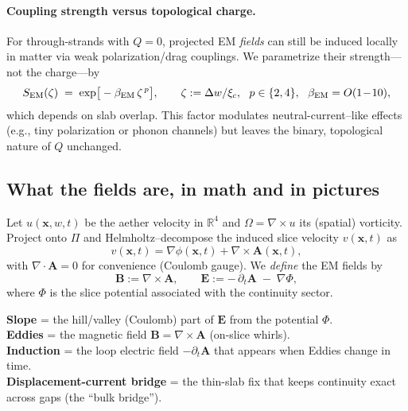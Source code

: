 \paragraph{Coupling strength versus topological charge.}
For through-strands with $Q=0$, projected EM \emph{fields} can still be induced locally in matter via weak polarization/drag couplings. We parametrize their strength—not the charge—by
\begin{equation}
\label{eq:SEM}
S_{\rm EM}(\zeta)\;=\;\exp\!\big[-\beta_{\rm EM}\,\zeta^{\,p}\big],\qquad
\zeta:=\Delta w/\xi_c,\ \ p\in\{2,4\},\ \ \beta_{\rm EM}=O(1\!-\!10),
\end{equation}
which depends on slab overlap. This factor modulates neutral-current–like effects (e.g., tiny polarization or phonon channels) but leaves the binary, topological nature of $Q$ unchanged.

\subsection{What the fields are, in math and in pictures}
Let $u(\mathbf x,w,t)$ be the aether velocity in $\mathbb{R}^4$ and $\Omega=\nabla\!\times u$ its (spatial) vorticity. Project onto $\Pi$ and Helmholtz–decompose the induced slice velocity $v(\mathbf x,t)$ as
\[
v(\mathbf x,t)=\nabla\phi(\mathbf x,t)+\nabla\times\mathbf A(\mathbf x,t),
\]
with $\nabla\!\cdot\!\mathbf A=0$ for convenience (Coulomb gauge). We \emph{define} the EM fields by
\begin{equation}
\mathbf B := \nabla\times\mathbf A,
\qquad
\mathbf E := -\,\partial_t \mathbf A \;-\; \nabla \Phi,
\label{eq:EM_defs}
\end{equation}
where $\Phi$ is the slice potential associated with the continuity sector.

\begin{tcolorbox}[title=Plain-language map]
\textbf{Slope} = the hill/valley (Coulomb) part of $\mathbf E$ from the potential $\Phi$.\\
\textbf{Eddies} = the magnetic field $\mathbf B=\nabla\times\mathbf A$ (on-slice whirls).\\
\textbf{Induction} = the loop electric field $-\partial_t\mathbf A$ that appears when Eddies change in time.\\
\textbf{Displacement-current bridge} = the thin-slab fix that keeps continuity exact across gaps (the “bulk bridge”).
\end{tcolorbox}


